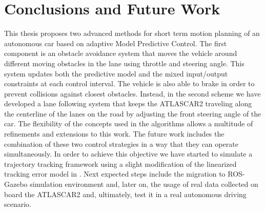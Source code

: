 \chapter*{Conclusions and Future Work}
This thesis proposes two advanced methods for short term motion planning of an autonomous car based on adaptive Model Predictive Control. The first component is an obstacle avoidance system that moves the vehicle around different moving obstacles in the lane using throttle and steering angle. This system updates both the predictive model and the mixed input/output constraints at each control interval. The vehicle is also able to brake in order to prevent collisions against closest obstacles. Instead, in the second scheme  we have developed a lane following system that keeps the ATLASCAR2 traveling along the centerline of the lanes on the road by adjusting the front steering angle of the car.  The flexibility of the concepts used in the algorithms allows a multitude of refinements and extensions to this work. The future work includes the combination of these two control strategies in a way that they can operate simultaneously. In order to achieve this objective we have started to simulate a trajectory tracking framework using a slight modification of the linearized tracking error model in \cite{error_model}. Next expected steps include the migration to ROS-Gazebo simulation environment and, later on, the usage of real data collected on board the ATLASCAR2 and, ultimately, test it in a real autonomous driving scenario.